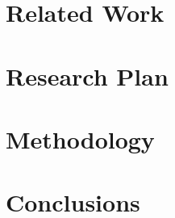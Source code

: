 \documentclass{book}
\begin{document}
\chapter{Related Work}
\label{chap:related}


\chapter{Research Plan}
\label{chap:work_plan}


\chapter{Methodology}
\label{chap:methodology}


\chapter{Conclusions}
\label{chap:conclusions}




\end{document}

